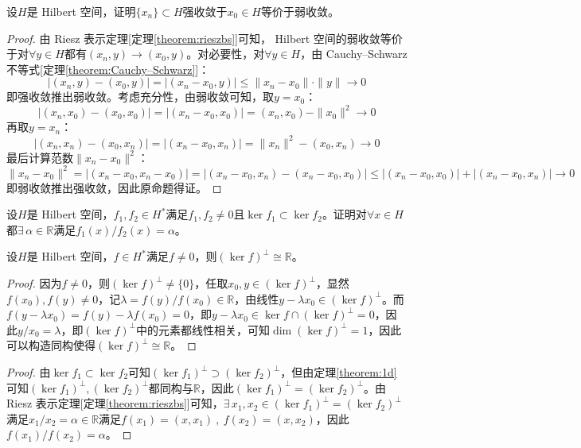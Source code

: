 \begin{example}
\quad 设$H$是 Hilbert 空间，证明$\{x_n\} \subset H$强收敛于$x_0 \in H$等价于弱收敛。
\end{example}
\begin{proof}
由 Riesz 表示定理[定理\ref{theorem:rieszbs}]可知， Hilbert 空间的弱收敛等价于对$\forall y \in H$都有$(x_n,y) \to (x_0,y)$。对必要性，对$\forall y \in H$，由 Cauchy–Schwarz 不等式[定理\ref{theorem:Cauchy–Schwarz}]：
\[|(x_n,y)-(x_0,y)|=|(x_n-x_0,y)|\leq\|x_n-x_0\|\cdot\|y\| \to 0\]
即强收敛推出弱收敛。考虑充分性，由弱收敛可知，取$y=x_0$：
\[|(x_n,x_0)-(x_0,x_0)|=|(x_n-x_0,x_0)|=(x_n,x_0)-\|x_0\|^2 \to 0\]
再取$y=x_n$：
\[|(x_n,x_n)-(x_0,x_n)|=|(x_n-x_0,x_n)|=\|x_n\|^2-(x_0,x_n) \to 0\]
最后计算范数$\|x_n-x_0\|^2$：
\[\|x_n-x_0\|^2=|(x_n-x_0,x_n-x_0)|=|(x_n-x_0,x_n)-(x_n-x_0,x_0)| \leq |(x_n-x_0,x_0)|+|(x_n-x_0,x_n)| \to 0\]
即弱收敛推出强收敛，因此原命题得证。
\end{proof}

\begin{example}
\quad 设$H$是 Hilbert 空间，$f_1,f_2 \in H^*$满足$f_1,f_2 \neq 0$且$\ker f_1 \subset \ker f_2$。证明对$\forall x \in H$都$\exists \, \alpha \in \mathbb{R}$满足$f_1(x)/f_2(x)=\alpha$。
\end{example}
\begin{theorem}\label{theorem:1d}
设$H$是 Hilbert 空间，$f \in H^*$满足$f \neq 0$，则$(\ker f)^{\perp} \cong \mathbb{R}$。
\end{theorem}
\begin{proof}
因为$f \neq 0$，则$(\ker f)^{\perp} \neq \{0\}$，任取$x_0,y \in (\ker f)^{\perp}$，显然$f(x_0),f(y) \neq 0$，记$\lambda=f(y)/f(x_0) \in \mathbb{R}$，由线性$y-\lambda x_0 \in (\ker f)^{\perp}$。而$f(y-\lambda x_0)=f(y)-\lambda f(x_0)=0$，即$y-\lambda x_0 \in \ker f \cap (\ker f)^{\perp}={0}$，因此$y/x_0=\lambda$，即$(\ker f)^{\perp}$中的元素都线性相关，可知$\dim (\ker f)^{\perp}=1$，因此可以构造同构使得$(\ker f)^{\perp} \cong \mathbb{R}$。
\end{proof}
\begin{proof}
由$\ker f_1 \subset \ker f_2$可知$(\ker f_1)^{\perp} \supset (\ker f_2)^{\perp}$，但由定理\ref{theorem:1d}可知$(\ker f_1)^{\perp},(\ker f_2)^{\perp}$都同构与$\mathbb{R}$，因此$(\ker f_1)^{\perp}=(\ker f_2)^{\perp}$。由 Riesz 表示定理[定理\ref{theorem:rieszbs}]可知，$\exists \, x_1,x_2 \in (\ker f_1)^{\perp}=(\ker f_2)^{\perp}$满足$x_1/x_2=\alpha\in\mathbb{R}$满足$f(x_1)=(x,x_1) \ , \ f(x_2)=(x,x_2)$，因此$f(x_1)/f(x_2)=\alpha$。
\end{proof}